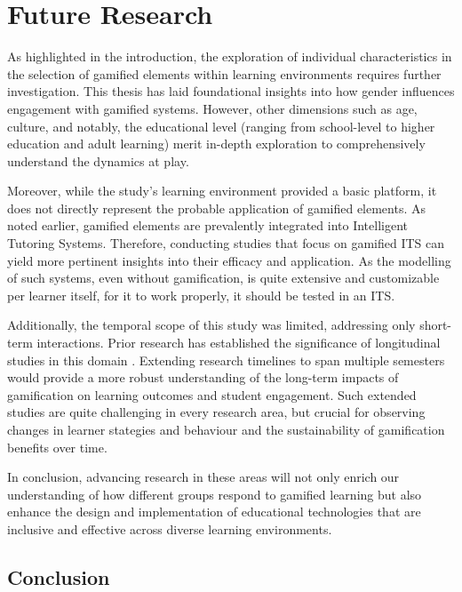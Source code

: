 \section{Future Research}
As highlighted in the introduction, the exploration of individual characteristics in the selection of gamified elements within learning environments requires further investigation. This thesis has laid foundational insights into how gender influences engagement with gamified systems. However, other dimensions such as age, culture, and notably, the educational level (ranging from school-level to higher education and adult learning) merit in-depth exploration to comprehensively understand the dynamics at play.

Moreover, while the study's learning environment provided a basic platform, it does not directly represent the probable application of gamified elements. As noted earlier, gamified elements are prevalently integrated into Intelligent Tutoring Systems. Therefore, conducting studies that focus on gamified ITS can yield more pertinent insights into their efficacy and application.
As the modelling of such systems, even without gamification, is quite extensive and customizable per learner itself, for it to work properly, it should be tested in an ITS.

Additionally, the temporal scope of this study was limited, addressing only short-term interactions. Prior research has established the significance of longitudinal studies in this domain \parencite{oliveiraTailoredGamificationEducation2023,dehghanzadehUsingGamificationSupport2024}. Extending research timelines to span multiple semesters would provide a more robust understanding of the long-term impacts of gamification on learning outcomes and student engagement. Such extended studies are quite challenging in every research area, but crucial for observing changes in learner stategies and behaviour and the sustainability of gamification benefits over time.

In conclusion, advancing research in these areas will not only enrich our understanding of how different groups respond to gamified learning but also enhance the design and implementation of educational technologies that are inclusive and effective across diverse learning environments.

\subsection{Conclusion}